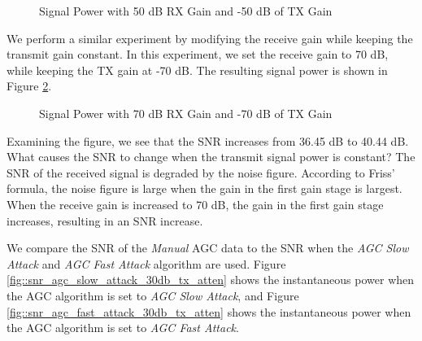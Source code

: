 \documentclass{article}
\begin{document}
\begin{figure}[H]
	\centerline{}
	\caption{Signal Power with 50 dB RX Gain and -50 dB of TX Gain}
	\label{fig::snr_manual_agc_50db_rx_gain_50db_tx_atten}
\end{figure}

We perform a similar experiment by modifying the receive gain while keeping the transmit gain constant. In this experiment, we set the receive gain to 70 dB, while keeping the TX gain at -70 dB. The resulting signal power is shown in Figure \ref{fig::snr_manual_agc_70db_rx_gain_70db_tx_atten}.

\begin{figure}[H]
	\centerline{}
	\caption{Signal Power with 70 dB RX Gain and -70 dB of TX Gain}
	\label{fig::snr_manual_agc_70db_rx_gain_70db_tx_atten}
\end{figure}

Examining the figure, we see that the SNR increases from 36.45 dB to 40.44 dB. What causes the SNR to change when the transmit signal power is constant? The SNR of the received signal is degraded by the noise figure. According to Friss' formula, the noise figure is large when the gain in the first gain stage is largest. When the receive gain is increased to 70 dB, the gain in the first gain stage increases, resulting in an SNR increase.

We compare the SNR of the \textit{Manual} AGC data to the SNR when the \textit{AGC Slow Attack} and \textit{AGC Fast Attack} algorithm are used. Figure \ref{fig::snr_agc_slow_attack_30db_tx_atten} shows the instantaneous power when the AGC algorithm is set to \textit{AGC Slow Attack}, and Figure \ref{fig::snr_agc_fast_attack_30db_tx_atten} shows the instantaneous power when the AGC algorithm is set to \textit{AGC Fast Attack}.
\end{document}
